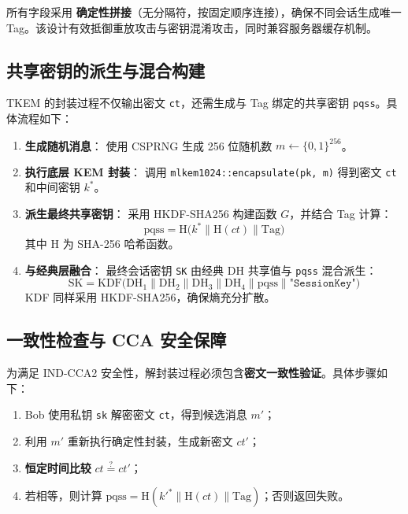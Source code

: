 所有字段采用 \textbf{确定性拼接}（无分隔符，按固定顺序连接），确保不同会话生成唯一 Tag。该设计有效抵御重放攻击与密钥混淆攻击，同时兼容服务器缓存机制。

\subsection{共享密钥的派生与混合构建}\label{sec:key_derivation}
TKEM 的封装过程不仅输出密文 \texttt{ct}，还需生成与 Tag 绑定的共享密钥 \texttt{pqss}。具体流程如下：

\begin{enumerate}
    \item \textbf{生成随机消息}：  
    使用 CSPRNG 生成 256 位随机数 $ m \leftarrow \{0,1\}^{256} $。

    \item \textbf{执行底层 KEM 封装}：  
    调用 \texttt{mlkem1024::encapsulate(pk, m)} 得到密文 \texttt{ct} 和中间密钥 $ k^* $。

    \item \textbf{派生最终共享密钥}：  
    采用 HKDF-SHA256 构建函数 $ G $，并结合 Tag 计算：
    \[
    \text{pqss} = \text{H}\big( k^* \parallel \text{H}(ct) \parallel \text{Tag} \big)
    \]
    其中 $ \text{H} $ 为 SHA-256 哈希函数。

    \item \textbf{与经典层融合}：  
    最终会话密钥 \texttt{SK} 由经典 DH 共享值与 \texttt{pqss} 混合派生：
    \[
    \text{SK} = \text{KDF}\big( \text{DH}_1 \parallel \text{DH}_2 \parallel \text{DH}_3 \parallel \text{DH}_4 \parallel \text{pqss} \parallel \texttt{"SessionKey"} \big)
    \]
    KDF 同样采用 HKDF-SHA256，确保熵充分扩散。
\end{enumerate}

\subsection{一致性检查与 CCA 安全保障}
为满足 IND-CCA2 安全性，解封装过程必须包含\textbf{密文一致性验证}。具体步骤如下：

\begin{enumerate}
    \item Bob 使用私钥 \texttt{sk} 解密密文 \texttt{ct}，得到候选消息 $ m' $；
    \item 利用 $ m' $ 重新执行确定性封装，生成新密文 $ ct' $；
    \item \textbf{恒定时间比较} $ ct \stackrel{?}{=} ct' $；
    \item 若相等，则计算 $ \text{pqss} = \text{H}(k'^* \parallel \text{H}(ct) \parallel \text{Tag}) $；否则返回失败。
\end{enumerate}


